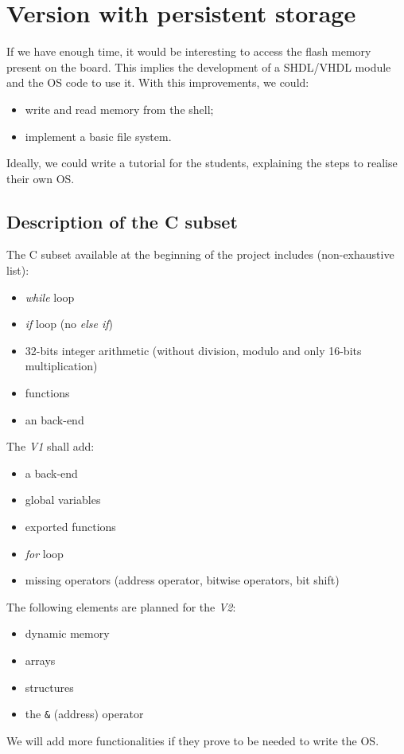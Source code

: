 \documentclass{article}
\begin{document}
    \section{Version with persistent storage}
      If we have enough time, it would be interesting to access the flash memory
      present on the board. This implies the development of a SHDL/VHDL module
      and the OS code to use it. With this improvements, we could:
      \begin{itemize}
        \item write and read memory from the shell;
        \item implement a basic file system.
      \end{itemize}
      Ideally, we could write a tutorial for the students, explaining the steps
      to realise their own OS.

  \newpage

  \begin{appendix}
    \section{Description of the C subset}\label{app:C89}
      The C subset available at the beginning of the project includes
      (non-exhaustive list):
      \begin{itemize}
        \item \textit{while} loop
        \item \textit{if} loop (no \textit{else if})
        \item 32-bits integer arithmetic (without division, modulo and only
          16-bits multiplication)
        \item functions
        \item an  back-end
      \end{itemize}

      \noindent The \textit{V1} shall add:
      \begin{itemize}
        \item a  back-end
        \item global variables
        \item exported functions
        \item \textit{for} loop
        \item missing operators (address operator, bitwise operators, bit shift)
      \end{itemize}

      \noindent The following elements are planned for the \textit{V2}:
      \begin{itemize}
        \item dynamic memory
        \item arrays
        \item structures
        \item the \verb+&+ (address) operator
      \end{itemize}
      We will add more functionalities if they prove to be needed to write the
      OS. 
  \end{appendix}
\end{document}
